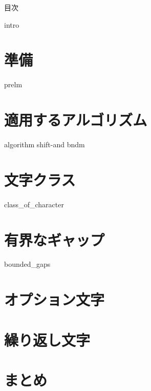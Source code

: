 \documentclass[12pt, dvipdfmx]{beamer}
\begin{document}
\maketitle
\begin{frame}{目次}
	\tableofcontents
\end{frame}

{intro}
\section{準備}
{prelm}
\section{適用するアルゴリズム}
{algorithm}
{shift-and}
{bndm}
\section{文字クラス}
{class_of_character}
\section{有界なギャップ}
{bounded_gaps}
\section{オプション文字}
\section{繰り返し文字}
\section{まとめ}
\end{document}
